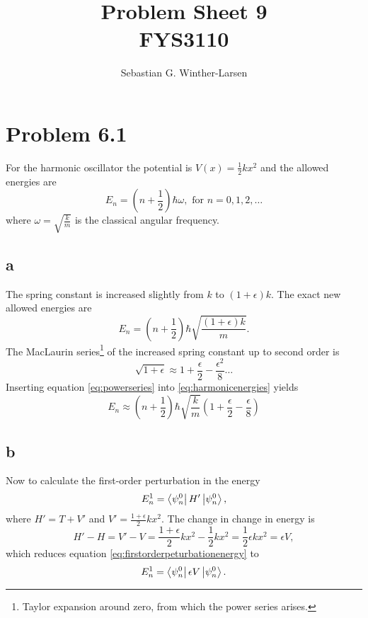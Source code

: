 \documentclass[11pt]{amsart}
\title[Problem Sheet 9]{Problem Sheet 9\\
		\large{FYS3110}}
\author[Winther-Larsen]{Sebastian G. Winther-Larsen}
\begin{document}
\maketitle

\section*{Problem 6.1}

For the harmonic oscillator the potential is $V(x) = \frac{1}{2}kx^2$ and the allowed energies are
\begin{equation}
E_n = \left(n + \frac{1}{2} \right)\hbar \omega, \text{ for } n = 0,1,2,\dots
\end{equation}
where $\omega = \sqrt{\frac{k}{m}}$ is the classical angular frequency. 

\subsection*{a}
The spring constant is increased slightly from $k$ to $(1+\epsilon)k$. The exact new allowed energies are
\begin{equation}
\label{eq:harmonicenergies}
E_n = \left(n + \frac{1}{2} \right)\hbar\sqrt{\frac{(1+\epsilon)k}{m}}.
\end{equation}
The MacLaurin series\footnote{Taylor expansion around zero, from which the power series arises.} of the increased spring constant up to second order is
\begin{equation}
\label{eq:powerseries}
\sqrt{1+\epsilon} \approx 1 + \frac{\epsilon}{2} - \frac{\epsilon^2}{8} \dots
\end{equation}
Inserting equation \ref{eq:powerseries} into \ref{eq:harmonicenergies} yields
\begin{equation}
E_n \approx \left(n + \frac{1}{2} \right)\hbar\sqrt{\frac{k}{m}}\left(1 + \frac{\epsilon}{2} - \frac{\epsilon}{8}\right) 
\end{equation}

\subsection*{b}
Now to calculate the first-order perturbation in the energy
\begin{equation}
\label{eq:firstorderpeturbationenergy}
E_n^1 = \bra{\psi_n^0}H'\ket{\psi_n^0},
\end{equation}
where $H' = T + V'$ and $V' = \frac{1+\epsilon}{2}kx^2$. The change in change in energy is
\begin{equation*}
H' - H = V' - V = \frac{1+\epsilon}{2}kx^2 - \frac{1}{2}kx^2 = \frac{1}{2}\epsilon kx^2 = \epsilon V, 
\end{equation*}
which reduces equation \ref{eq:firstorderpeturbationenergy} to
\begin{equation}
\label{eq:firstorderpeturbationenergy1}
E_n^1 = \bra{\psi_n^0}\epsilon V \ket{\psi_n^0}.
\end{equation}
\end{document}
